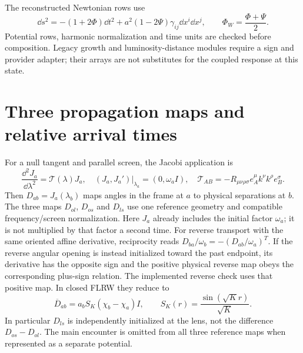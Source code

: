 The reconstructed Newtonian rows use
\begin{equation}
 \dd s^2=-(1+2\Phi)\dd t^2
 +a^2(1-2\Psi)\gamma_{ij}\dd x^i\dd x^j,
 \qquad \Phi_W=\frac{\Phi+\Psi}{2}.
 \label{eq:sl-metric}
\end{equation}
Potential rows, harmonic normalization and time units are checked before
composition. Legacy growth and luminosity-distance modules require a sign
and provider adapter; their arrays are not substitutes for the coupled
response at this state.

\section{Three propagation maps and relative arrival times}
\label{sec:sl-propagation}
For a null tangent and parallel screen, the Jacobi application is
\begin{equation}
 \frac{\dd^2J_a}{\dd\lambda^2}=\mathcal T(\lambda)J_a,
 \quad (J_a,J_a')|_{\lambda_a}=(0,\omega_a I),
 \quad \mathcal T_{AB}=-R_{\mu\nu\rho\sigma}
 e_A^\mu k^\nu k^\rho e_B^\sigma.
 \label{eq:sl-jacobi}
\end{equation}
Then $D_{ab}=J_a(\lambda_b)$ maps angles in the frame at $a$ to physical
separations at $b$. The three maps $D_{ol}$, $D_{os}$ and $D_{ls}$ use one
reference geometry and compatible frequency/screen normalization.
Here $J_a$ already includes the initial factor $\omega_a$; it is not
multiplied by that factor a second time. For reverse transport with the
same oriented affine derivative, reciprocity reads
$D_{ba}/\omega_b=-(D_{ab}/\omega_a)^T$. If the reverse angular opening is
instead initialized toward the past endpoint, its derivative has the
opposite sign and the positive physical reverse map obeys the corresponding
plus-sign relation. The implemented reverse check uses that positive map.
In closed FLRW they reduce to
\begin{equation}
 \overline D_{ab}=a_b S_K(\chi_b-\chi_a)I,
 \qquad S_K(r)=\frac{\sin(\sqrt K r)}{\sqrt K}.
 \label{eq:sl-flrw-distance}
\end{equation}
In particular $D_{ls}$ is independently initialized at the lens, not the
difference $D_{os}-D_{ol}$. The main encounter is omitted from all three
reference maps when represented as a separate potential.

